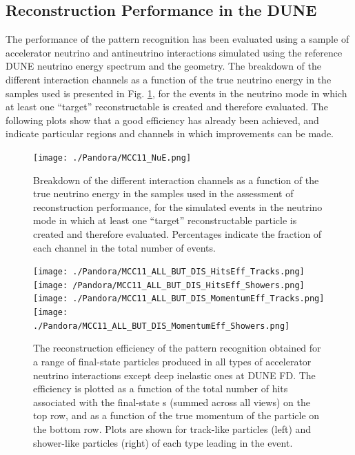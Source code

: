 \subsection{Reconstruction Performance in the DUNE }
\label{sec:Pandora:DUNEFD}

The performance of the  pattern recognition has been evaluated using a sample of accelerator neutrino and antineutrino interactions simulated using the reference DUNE neutrino energy spectrum and the \nominalmodsize {} geometry. The breakdown of the different interaction channels as a function of the true neutrino energy in the samples used is presented in Fig. \ref{breakdown_nuenergy}, for the events in the neutrino mode in which at least one ``target'' reconstructable  is created and therefore evaluated. The following plots show that a good efficiency has already been achieved, and indicate particular regions and channels in which improvements can be made. 

\begin{figure}[!ht]
\centering
\texttt{[image: ./Pandora/MCC11\_NuE.png]}
\caption[Breakdown of interaction channels vs true neutrino energy of the simulated events used to assess the reconstruction performance.]{Breakdown of the different interaction channels as a function of the true neutrino energy in the samples used in the assessment of reconstruction performance, for the simulated events in the neutrino mode in which at least one ``target'' reconstructable  particle is created and therefore evaluated. Percentages indicate the fraction of each channel in the total number of events.}
\label{breakdown_nuenergy}
\end{figure}

\begin{figure}[!ht]
\centering
\texttt{[image: ./Pandora/MCC11\_ALL\_BUT\_DIS\_HitsEff\_Tracks.png]}\texttt{[image: /Pandora/MCC11\_ALL\_BUT\_DIS\_HitsEff\_Showers.png]}
\texttt{[image: ./Pandora/MCC11\_ALL\_BUT\_DIS\_MomentumEff\_Tracks.png]}\texttt{[image: ./Pandora/MCC11\_ALL\_BUT\_DIS\_MomentumEff\_Showers.png]}

\caption[Reconstruction efficiency of  pattern recognition for a range of final-state particles at the ]{The reconstruction efficiency of the  pattern recognition obtained for a range of final-state particles produced in all types of accelerator neutrino interactions except deep inelastic ones at DUNE FD. The efficiency is plotted as a function of the total number of \twod hits associated with the final-state s (summed across all views) on the top row, and as a function of the true momentum of the particle on the bottom row. Plots are shown for track-like particles (left) and shower-like particles (right) of each type leading in the event.}
\label{pandora_particle_efficiency}
\end{figure}

